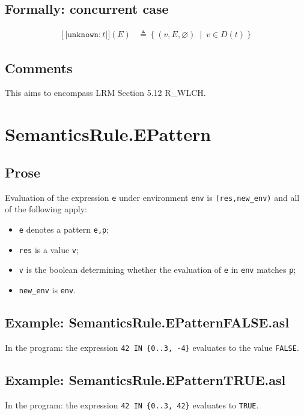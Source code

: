 \documentclass{book}
\newcommand\syntt[1]{\mathtt{#1}}
\newcommand\llbracket{[|}
\newcommand\rrbracket{|]}
\newcommand\interp[1]{\left\llbracket #1 \right\rrbracket}
\newcommand\st[0]{\ \middle|\ }
\begin{document}
  \subsection{Formally: concurrent case}

  \begin{align}
  \interp{\syntt{unknown:} t} (E) & \triangleq \left\{ (v, E, \varnothing) \st{} v \in{} D(t) \right\}
  \label{eq:sem-conc-unknown}
  \end{align}

  \subsection{Comments}
  This aims to encompass LRM Section 5.12 R\_WLCH.

\section{SemanticsRule.EPattern \label{sec:SemanticsRule.EPattern}}


  \subsection{Prose}
  Evaluation of the expression \texttt{e} under environment \texttt{env} is
  \texttt{(res,new\_env)} and all of the following apply:
  \begin{itemize}
  \item \texttt{e} denotes a pattern \texttt{e,p};
  \item \texttt{res} is a value \texttt{v};
  \item \texttt{v} is the boolean determining whether the evaluation of \texttt{e} in \texttt{env} matches \texttt{p};
  \item \texttt{new\_env} is \texttt{env}.
  \end{itemize}

  \subsection{Example: SemanticsRule.EPatternFALSE.asl}
    In the program:
    the expression \texttt{42 IN \{0..3, -4\}} evaluates to the value \texttt{FALSE}.

  \subsection{Example: SemanticsRule.EPatternTRUE.asl}
    In the program:
    the expression \texttt{42 IN \{0..3, 42\}} evaluates to \texttt{TRUE}.
\end{document}
